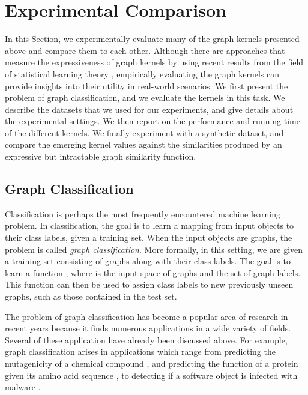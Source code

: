 \documentclass[twoside,11pt]{article}
\begin{document}
\section{Experimental Comparison}\label{sec:experiments}
In this Section, we experimentally evaluate many of the graph kernels presented above and compare them to each other.
Although there are approaches that measure the expressiveness of graph kernels by using recent results from the field of statistical learning theory , empirically evaluating the graph kernels can provide insights into their utility in real-world scenarios.
We first present the problem of graph classification, and we evaluate the kernels in this task.
We describe the datasets that we used for our experiments, and give details about the experimental settings.
We then report on the performance and running time of the different kernels.
We finally experiment with a synthetic dataset, and compare the emerging kernel values against the similarities produced by an expressive but intractable graph similarity function.

\subsection{Graph Classification}
Classification is perhaps the most frequently encountered machine learning problem.
In classification, the goal is to learn a mapping from input objects to their class labels, given a training set.
When the input objects are graphs, the problem is called \textit{graph classification}.
More formally, in this setting, we are given a training set  consisting of  graphs along with their class labels.
The goal is to learn a function , where  is the input space of graphs and  the set of graph labels.
This function can then be used to assign class labels to new previously unseen graphs, such as those contained in the test set.

The problem of graph classification has become a popular area of research in recent years because it finds numerous applications in a wide variety of fields.
Several of these application have already been discussed above.
For example, graph classification arises in applications which range from predicting the mutagenicity of a chemical compound , and predicting the function of a protein given its amino acid sequence , to detecting if a software object is infected with malware .
\end{document}
